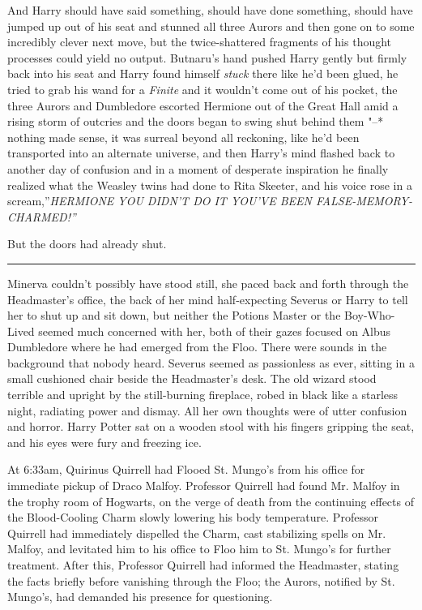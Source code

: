 And Harry should have said something, should have done something, should
have jumped up out of his seat and stunned all three Aurors and then
gone on to some incredibly clever next move, but the twice-shattered
fragments of his thought processes could yield no output. Butnaru's hand
pushed Harry gently but firmly back into his seat and Harry found
himself \emph{stuck} there like he'd been glued, he tried to grab his
wand for a \emph{Finite} and it wouldn't come out of his pocket, the
three Aurors and Dumbledore escorted Hermione out of the Great Hall amid
a rising storm of outcries and the doors began to swing shut behind them
"--* nothing made sense, it was surreal beyond all reckoning, like he'd
been transported into an alternate universe, and then Harry's mind
flashed back to another day of confusion and in a moment of desperate
inspiration he finally realized what the Weasley twins had done to Rita
Skeeter, and his voice rose in a scream,''\emph{HERMIONE YOU DIDN'T DO
IT YOU'VE BEEN FALSE-MEMORY-CHARMED!''}

But the doors had already shut.

\begin{center}\rule{3in}{0.4pt}\end{center}

Minerva couldn't possibly have stood still, she paced back and forth
through the Headmaster's office, the back of her mind half-expecting
Severus or Harry to tell her to shut up and sit down, but neither the
Potions Master or the Boy-Who-Lived seemed much concerned with her, both
of their gazes focused on Albus Dumbledore where he had emerged from the
Floo. There were sounds in the background that nobody heard. Severus
seemed as passionless as ever, sitting in a small cushioned chair beside
the Headmaster's desk. The old wizard stood terrible and upright by the
still-burning fireplace, robed in black like a starless night, radiating
power and dismay. All her own thoughts were of utter confusion and
horror. Harry Potter sat on a wooden stool with his fingers gripping the
seat, and his eyes were fury and freezing ice.

At 6:33am, Quirinus Quirrell had Flooed St. Mungo's from his office for
immediate pickup of Draco Malfoy. Professor Quirrell had found Mr.
Malfoy in the trophy room of Hogwarts, on the verge of death from the
continuing effects of the Blood-Cooling Charm slowly lowering his body
temperature. Professor Quirrell had immediately dispelled the Charm,
cast stabilizing spells on Mr. Malfoy, and levitated him to his office
to Floo him to St. Mungo's for further treatment. After this, Professor
Quirrell had informed the Headmaster, stating the facts briefly before
vanishing through the Floo; the Aurors, notified by St. Mungo's, had
demanded his presence for questioning.

